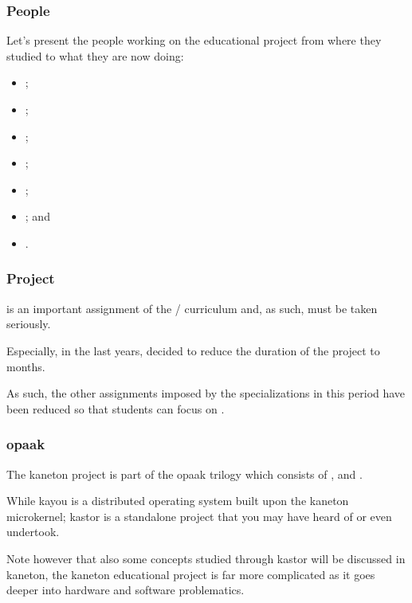 
\begin{frame}
  \frametitle{People}

  Let's present the people working on the educational project from where they
  studied to what they are now doing:

  \begin{itemize}
    \item
      ;
    \item
      ;
    \item
      ;
    \item
      ;
    \item
      ;
    \item
      ; and
    \item
      .
  \end{itemize}
\end{frame}


\begin{frame}
  \frametitle{Project}

   is an important assignment of the /
  curriculum and, as such, must be taken seriously.

  \-

  Especially, in the last years,  decided to reduce the duration
  of the project to  months.

  \-

  As such, the other assignments imposed by the specializations in this
  period have been reduced so that students can focus on .
\end{frame}


\begin{frame}
  \frametitle{opaak}

  The kaneton project is part of the opaak trilogy which consists
  of ,  and .

  \-

  While kayou is a distributed operating system built upon the kaneton
  microkernel; kastor is a standalone project that you may have heard of
  or even undertook.

  \-

  Note however that also some concepts studied through kastor will be
  discussed in kaneton, the kaneton educational project is far more
  complicated as it goes deeper into hardware and software problematics.
\end{frame}

